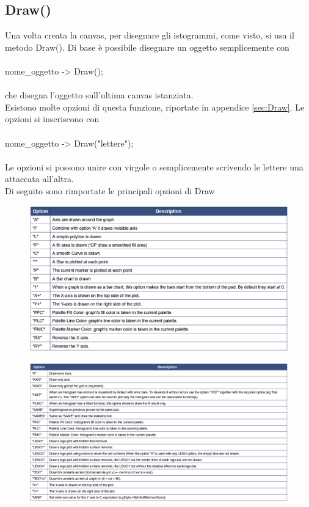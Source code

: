 \documentclass[10pt,a4paper]{article}
\begin{document}
\subsection{Draw()}
Una volta creata la canvas, per disegnare gli istogrammi, come visto, si usa il metodo Draw(). Di base è possibile disegnare un oggetto semplicemente con\\\\
nome\_oggetto -> Draw();\\\\ 
che disegna l'oggetto sull'ultima canvas istanziata.\\
Esistono molte opzioni di questa funzione, riportate in appendice \ref{sec:Draw}. Le opzioni si inseriscono con\\\\
nome\_oggetto -> Draw("lettere");\\\\
Le opzioni si possono unire con virgole o semplicemente scrivendo le lettere una attaccata all'altra.\\
Di seguito sono rimportate le principali opzioni di Draw
\begin{figure}[h!]
	\centering
	\includegraphics[width=1.\linewidth]{"Screenshot 2022-06-04 221503"}
\end{figure}
\FloatBarrier
\begin{figure}[h!]
	\centering
	\includegraphics[width=1.\linewidth]{"Screenshot 2022-06-04 222020"}
\end{figure}
\FloatBarrier
\newpage 
\end{document}
